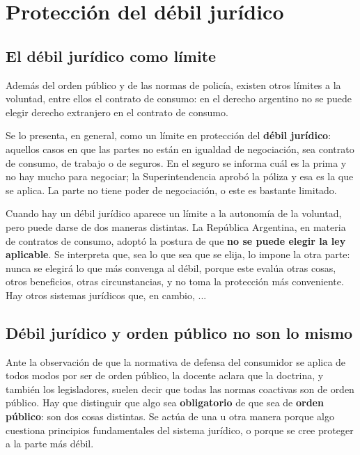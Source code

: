 \documentclass[12pt,oneside]{book}
\begin{document}
\chapter[Protecci\'on del d\'ebil jur\'idico]{Protecci\'on del d\'ebil jur\'idico}

\section{El d\'ebil jur\'idico como l\'imite}

Adem\'as del orden p\'ublico y de las normas de polic\'ia, existen otros l\'imites a la voluntad, entre ellos el contrato de consumo: en el derecho argentino no se puede elegir derecho extranjero en el contrato de consumo.

Se lo presenta, en general, como un l\'imite en protecci\'on del \textbf{d\'ebil jur\'idico}: aquellos casos en que las partes no est\'an en igualdad de negociaci\'on, sea contrato de consumo, de trabajo o de seguros. En el seguro se informa cu\'al es la prima y no hay mucho para negociar; la Superintendencia aprob\'o la p\'oliza y esa es la que se aplica. La parte no tiene poder de negociaci\'on, o este es bastante limitado.

Cuando hay un d\'ebil jur\'idico aparece un l\'imite a la autonom\'ia de la voluntad, pero puede darse de dos maneras distintas. La Rep\'ublica Argentina, en materia de contratos de consumo, adopt\'o la postura de que \textbf{no se puede elegir la ley aplicable}. Se interpreta que, sea lo que sea que se elija, lo impone la otra parte: nunca se elegir\'a lo que m\'as convenga al d\'ebil, porque este eval\'ua otras cosas, otros beneficios, otras circunstancias, y no toma la protecci\'on m\'as conveniente. Hay otros sistemas jur\'idicos que, en cambio, ...


\section{D\'ebil jur\'idico y orden p\'ublico no son lo mismo}

Ante la observaci\'on de que la normativa de defensa del consumidor se aplica de todos modos por ser de orden p\'ublico, la docente aclara que la doctrina, y tambi\'en los legisladores, suelen decir que todas las normas coactivas son de orden p\'ublico. Hay que distinguir que algo sea \textbf{obligatorio} de que sea de \textbf{orden p\'ublico}: son dos cosas distintas. Se act\'ua de una u otra manera porque algo cuestiona principios fundamentales del sistema jur\'idico, o porque se cree proteger a la parte m\'as d\'ebil.
\end{document}
